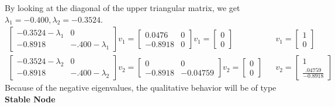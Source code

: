 \documentclass[12pt]{article}
\begin{document}
By looking at the diagonal of the upper triangular matrix, we get $\lambda_1 = -0.400, \lambda_2 = -0.3524$.
\begin{align*}
\begin{bmatrix}
-0.3524 - \lambda_1 & 0 \\
-0.8918 & -.400 - \lambda_1
\end{bmatrix}v_1 = 
\begin{bmatrix}
 0.0476 &  0 \\
-0.8918    &  0
\end{bmatrix}v_1 = 
\begin{bmatrix}
0 \\ 0
\end{bmatrix} && 
v_1 = 
\begin{bmatrix}
1 \\ 0
\end{bmatrix} \\
\begin{bmatrix}
-0.3524 - \lambda_2 & 0 \\
-0.8918 & -.400 - \lambda_2
\end{bmatrix}v_2 = 
\begin{bmatrix}
 0  &       0 \\
-0.8918  &  -0.04759
\end{bmatrix}v_2 = 
\begin{bmatrix}
0 \\ 0
\end{bmatrix} && 
v_2 = 
\begin{bmatrix}
1 \\ \frac{.04759}{-0.8918}
\end{bmatrix}
\end{align*}	
Because of the negative eigenvalues, the qualitative behavior will be of type \textbf{Stable Node}
\newpage 
\end{document}
